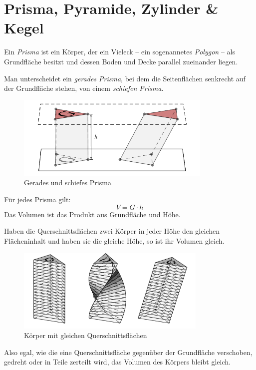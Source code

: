 \section{Prisma, Pyramide, Zylinder \& Kegel}

\begin{defi}[Prisma]Ein \emph{Prisma} ist ein Körper, der ein Vieleck -- ein sogenannetes \emph{Polygon} -- als Grundfläche besitzt und dessen Boden und Decke parallel zueinander liegen.
 
Man unterscheidet ein \emph{gerades Prisma}, bei dem die Seitenflächen senkrecht auf der Grundfläche stehen, von einem \emph{schiefen Prisma}.
\begin{figure}
  \begin{center}
\includegraphics[height=4cm]{./prisma.pdf}
\caption{Gerades und schiefes Prisma}
\end{center}
 \end{figure}

\end{defi}

\begin{regel}
 Für jedes Prisma gilt:
 \begin{equation*}
  V = G \cdot h
 \end{equation*}
 Das Volumen ist das Produkt aus Grundfläche und Höhe.
\end{regel}

\begin{regel}
 Haben die Querschnittsflächen zwei Körper in jeder Höhe den gleichen Flächeninhalt und haben sie die gleiche Höhe, so ist ihr Volumen gleich.
 \begin{figure}
  \begin{center}
\includegraphics[height=4cm]{./prisma2.pdf}
\caption{Körper mit gleichen Querschnittsflächen}
\end{center}
 \end{figure}
 
 Also egal, wie die eine Querschnittsfläche gegenüber der Grundfläche verschoben, gedreht oder in Teile zerteilt wird, das Volumen des Körpers bleibt gleich.
\end{regel}


